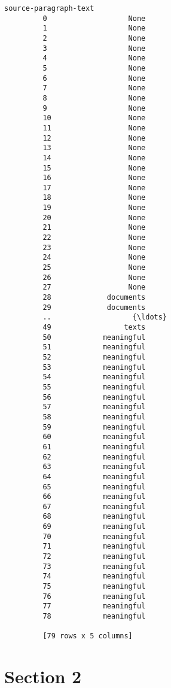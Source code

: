 \documentclass[11pt]{article}
\begin{document}
\begin{Verbatim}[commandchars=\\\{\}]
            source-paragraph-text  
         0                   None  
         1                   None  
         2                   None  
         3                   None  
         4                   None  
         5                   None  
         6                   None  
         7                   None  
         8                   None  
         9                   None  
         10                  None  
         11                  None  
         12                  None  
         13                  None  
         14                  None  
         15                  None  
         16                  None  
         17                  None  
         18                  None  
         19                  None  
         20                  None  
         21                  None  
         22                  None  
         23                  None  
         24                  None  
         25                  None  
         26                  None  
         27                  None  
         28             documents  
         29             documents  
         ..                   {\ldots}  
         49                 texts  
         50            meaningful  
         51            meaningful  
         52            meaningful  
         53            meaningful  
         54            meaningful  
         55            meaningful  
         56            meaningful  
         57            meaningful  
         58            meaningful  
         59            meaningful  
         60            meaningful  
         61            meaningful  
         62            meaningful  
         63            meaningful  
         64            meaningful  
         65            meaningful  
         66            meaningful  
         67            meaningful  
         68            meaningful  
         69            meaningful  
         70            meaningful  
         71            meaningful  
         72            meaningful  
         73            meaningful  
         74            meaningful  
         75            meaningful  
         76            meaningful  
         77            meaningful  
         78            meaningful  
         
         [79 rows x 5 columns]
\end{Verbatim}
            
    \section{\texorpdfstring{{Section 2}}{Section 2}}\label{section-2}
\end{document}
